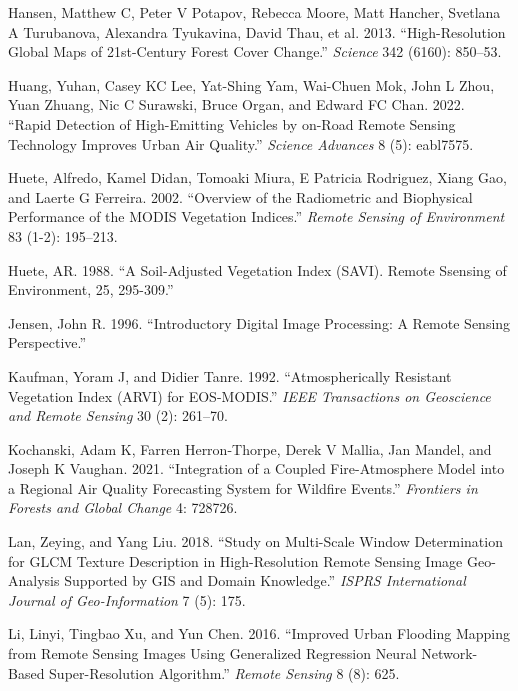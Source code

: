\documentclass[
  letterpaper,
  DIV=11,
  numbers=noendperiod]{scrreprt}
\newlength{\cslhangindent}
\newlength{\cslentryspacingunit} %
\newenvironment{CSLReferences}[2] %
 {%
  \setlength{\parindent}{0pt}
  \ifodd #1
  \let\oldpar\par
  \def\par{\hangindent=\cslhangindent\oldpar}
  \fi
  \setlength{\parskip}{#2\cslentryspacingunit}
 }%
 {}
\begin{document}
\begin{CSLReferences}{1}{0}
\leavevmode{}%
Hansen, Matthew C, Peter V Potapov, Rebecca Moore, Matt Hancher,
Svetlana A Turubanova, Alexandra Tyukavina, David Thau, et al. 2013.
{``High-Resolution Global Maps of 21st-Century Forest Cover Change.''}
\emph{Science} 342 (6160): 850--53.

\leavevmode{}%
Huang, Yuhan, Casey KC Lee, Yat-Shing Yam, Wai-Chuen Mok, John L Zhou,
Yuan Zhuang, Nic C Surawski, Bruce Organ, and Edward FC Chan. 2022.
{``Rapid Detection of High-Emitting Vehicles by on-Road Remote Sensing
Technology Improves Urban Air Quality.''} \emph{Science Advances} 8 (5):
eabl7575.

\leavevmode{}%
Huete, Alfredo, Kamel Didan, Tomoaki Miura, E Patricia Rodriguez, Xiang
Gao, and Laerte G Ferreira. 2002. {``Overview of the Radiometric and
Biophysical Performance of the MODIS Vegetation Indices.''} \emph{Remote
Sensing of Environment} 83 (1-2): 195--213.

\leavevmode{}%
Huete, AR. 1988. {``A Soil-Adjusted Vegetation Index (SAVI). Remote
Ssensing of Environment, 25, 295-309.''}

\leavevmode{}%
Jensen, John R. 1996. {``Introductory Digital Image Processing: A Remote
Sensing Perspective.''}

\leavevmode{}%
Kaufman, Yoram J, and Didier Tanre. 1992. {``Atmospherically Resistant
Vegetation Index (ARVI) for EOS-MODIS.''} \emph{IEEE Transactions on
Geoscience and Remote Sensing} 30 (2): 261--70.

\leavevmode{}%
Kochanski, Adam K, Farren Herron-Thorpe, Derek V Mallia, Jan Mandel, and
Joseph K Vaughan. 2021. {``Integration of a Coupled Fire-Atmosphere
Model into a Regional Air Quality Forecasting System for Wildfire
Events.''} \emph{Frontiers in Forests and Global Change} 4: 728726.

\leavevmode{}%
Lan, Zeying, and Yang Liu. 2018. {``Study on Multi-Scale Window
Determination for GLCM Texture Description in High-Resolution Remote
Sensing Image Geo-Analysis Supported by GIS and Domain Knowledge.''}
\emph{ISPRS International Journal of Geo-Information} 7 (5): 175.

\leavevmode{}%
Li, Linyi, Tingbao Xu, and Yun Chen. 2016. {``Improved Urban Flooding
Mapping from Remote Sensing Images Using Generalized Regression Neural
Network-Based Super-Resolution Algorithm.''} \emph{Remote Sensing} 8
(8): 625.


\end{CSLReferences}
\end{document}

